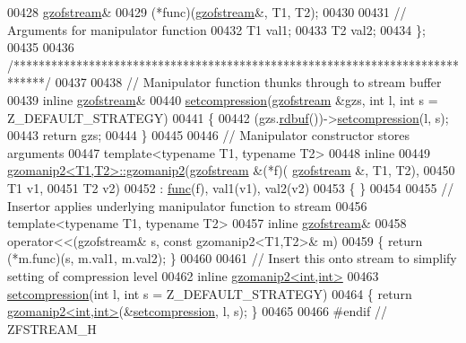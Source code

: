 \begin{DoxyCode}
00428     \hyperlink{classgzofstream}{gzofstream}&
00429     (*func)(\hyperlink{classgzofstream}{gzofstream}&, T1, T2);
00430 
00431     \textcolor{comment}{// Arguments for manipulator function}
00432     T1 val1;
00433     T2 val2;
00434   \};
00435 
00436 \textcolor{comment}{/*****************************************************************************/}
00437 
00438 \textcolor{comment}{// Manipulator function thunks through to stream buffer}
00439 \textcolor{keyword}{inline} \hyperlink{classgzofstream}{gzofstream}&
00440 \hyperlink{classgzfilebuf_ad109ea4fc4ca7cc19d8014b53375255d}{setcompression}(\hyperlink{classgzofstream}{gzofstream} &gzs, \textcolor{keywordtype}{int} l, \textcolor{keywordtype}{int} s = Z\_DEFAULT\_STRATEGY)
00441 \{
00442   (gzs.\hyperlink{classgzofstream_a2fef74202b114357f41cfeb28f1d2acc}{rdbuf}())->\hyperlink{classgzfilebuf_ad109ea4fc4ca7cc19d8014b53375255d}{setcompression}(l, s);
00443   \textcolor{keywordflow}{return} gzs;
00444 \}
00445 
00446 \textcolor{comment}{// Manipulator constructor stores arguments}
00447 \textcolor{keyword}{template}<\textcolor{keyword}{typename} T1, \textcolor{keyword}{typename} T2>
00448   \textcolor{keyword}{inline}
00449   \hyperlink{classgzomanip2}{gzomanip2<T1,T2>::gzomanip2}(\hyperlink{classgzofstream}{gzofstream} &(*f)(
      \hyperlink{classgzofstream}{gzofstream} &, T1, T2),
00450                               T1 v1,
00451                               T2 v2)
00452   : \hyperlink{structfunc}{func}(f), val1(v1), val2(v2)
00453   \{ \}
00454 
00455 \textcolor{comment}{// Insertor applies underlying manipulator function to stream}
00456 \textcolor{keyword}{template}<\textcolor{keyword}{typename} T1, \textcolor{keyword}{typename} T2>
00457   \textcolor{keyword}{inline} \hyperlink{classgzofstream}{gzofstream}&
00458   operator<<(gzofstream& s, const gzomanip2<T1,T2>& m)
00459   \{ \textcolor{keywordflow}{return} (*m.func)(s, m.val1, m.val2); \}
00460 
00461 \textcolor{comment}{// Insert this onto stream to simplify setting of compression level}
00462 \textcolor{keyword}{inline} \hyperlink{classgzomanip2}{gzomanip2<int,int>}
00463 \hyperlink{classgzfilebuf_ad109ea4fc4ca7cc19d8014b53375255d}{setcompression}(\textcolor{keywordtype}{int} l, \textcolor{keywordtype}{int} s = Z\_DEFAULT\_STRATEGY)
00464 \{ \textcolor{keywordflow}{return} \hyperlink{classgzomanip2}{gzomanip2<int,int>}(&\hyperlink{classgzfilebuf_ad109ea4fc4ca7cc19d8014b53375255d}{setcompression}, l, s); \}
00465 
00466 \textcolor{preprocessor}{#endif // ZFSTREAM\_H}
\end{DoxyCode}

